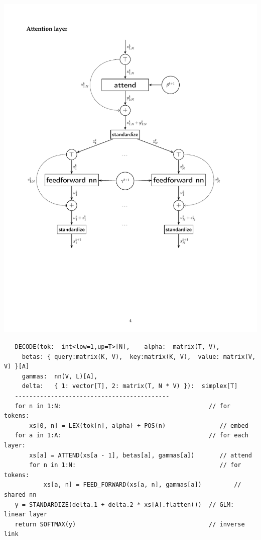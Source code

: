 \documentclass[9pt]{report}
\begin{document}
{
\begin{center}
\vspace*{-24pt}
\hfill\includegraphics[height=\textheight]{img/attention-diagram.pdf}
\end{center}

\footnotesize
\begin{center}
\begin{verbatim}
   DECODE(tok:  int<low=1,up=T>[N],    alpha:  matrix(T, V),
     betas: { query:matrix(K, V),  key:matrix(K, V),  value: matrix(V, V) }[A]
     gammas:  nn(V, L)[A],
     delta:   { 1: vector[T], 2: matrix(T, N * V) }):  simplex[T]
   -------------------------------------------
   for n in 1:N:                                         // for tokens:
       xs[0, n] = LEX(tok[n], alpha) + POS(n)               // embed
   for a in 1:A:                                         // for each layer:
       xs[a] = ATTEND(xs[a - 1], betas[a], gammas[a])       // attend
       for n in 1:N:                                        // for tokens:
           xs[a, n] = FEED_FORWARD(xs[a, n], gammas[a])         // shared nn
   y = STANDARDIZE(delta.1 + delta.2 * xs[A].flatten())  // GLM: linear layer
   return SOFTMAX(y)                                     // inverse link
\end{verbatim}
\end{center}
\normalsize

}
\end{document}
